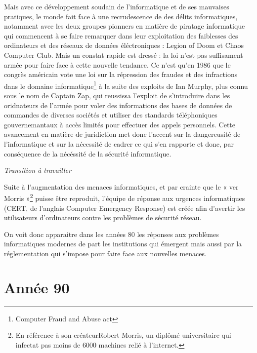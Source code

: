 \documentclass[a4paper]{memoir}
\begin{document}
Mais avec ce développement soudain de l'informatique et de ses mauvaises pratiques, le monde fait face à une recrudescence de des délits informatiques, notamment avec les deux groupes pionners en matière de piratage informatique qui commencent à se faire remarquer dans leur exploitation des faiblesses des ordinateurs et des réseaux de données éléctroniques : Legion of Doom et Chaos Computer Club. Mais un constat rapide est dressé : la loi n'est pas suffisament armée pour faire face à cette nouvelle tendance. Ce n'est qu'en 1986 que le congrès américain vote une loi sur la répression des fraudes et des infractions dans le domaine informatique\footnote{Computer Fraud and Abuse act} à la suite des exploits de Ian Murphy, plus connu sous le nom de Captain Zap, qui reussissa l'exploit de s'introduire dans les oridnateurs de l'armée pour voler des informations des bases de données de commandes de diverses sociétés et utiliser des standards téléphoniques gouvernemantaux à accès limités pour effectuer des appels personnels. 
Cette avancement en matière de juridiction met donc l'accent sur la dangereusité de l'informatique et sur la nécessité de cadrer ce qui s'en rapporte et donc, par conséquence de la nécéssité de la sécurité informatique.

\textit{Transition à travailler}

Suite à l'augmentation des menaces informatiques, et par crainte que le « ver Morris »\footnote{En référence à son créateurRobert Morris, un diplômé universitaire qui infectat pas moins de 6000 machines relié à l'internet.} puisse être reproduit, l'équipe de réponse aux urgences informatiques (CERT, de l'anglais Computer Emergency Response) est créée afin d'avertir les utilisateurs d'ordinateurs contre les problèmes de sécurité réseau.

On voit donc apparaitre dans les années 80 les réponses aux problèmes informatiques modernes de part les institutions qui émergent mais aussi par la réglementation qui s'impose pour faire face aux nouvelles menaces.

\section{Année 90}
\end{document}
